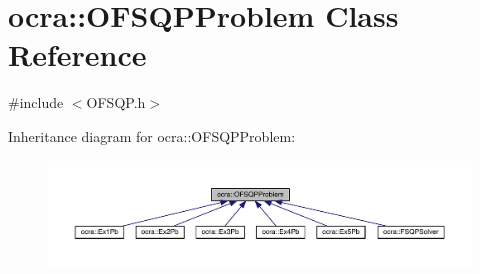 \hypertarget{classocra_1_1OFSQPProblem}{}\section{ocra\+:\+:O\+F\+S\+Q\+P\+Problem Class Reference}
\label{classocra_1_1OFSQPProblem}


{\ttfamily \#include $<$O\+F\+S\+Q\+P.\+h$>$}



Inheritance diagram for ocra\+:\+:O\+F\+S\+Q\+P\+Problem\+:\nopagebreak
\begin{figure}[H]
\begin{center}
\leavevmode
\includegraphics[width=350pt]{da/d7b/classocra_1_1OFSQPProblem__inherit__graph}
\end{center}
\end{figure}
